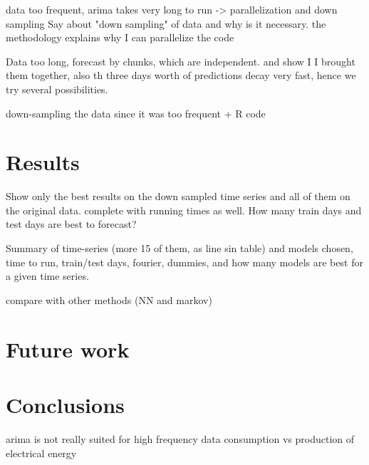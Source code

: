 \documentclass[12pt,a4paper,titlepage]{report}
\begin{document}
data too frequent, arima takes very long to run -> parallelization and down sampling
Say about "down sampling" of data and why is it necessary.
the methodology explains why I can parallelize the code

Data too long, forecast by chunks, which are independent. and show I I brought them together, also th three days worth of predictions decay very fast, hence we try several possibilities.

down-sampling the data since it was too frequent + R code

\section{Results} \label{resultssection}

Show only the best results on the down sampled time series and all of them on the original data. complete with running times as well.
How many train days and test days are best to forecast?

Summary of time-series (more 15 of them, as line sin table) and models chosen, time to run, train/test days, fourier, dummies, and how many models are best for a given time series.


compare with other methods (NN and markov)


\section{Future work}

\section{Conclusions}

arima is not really suited for high frequency data
consumption vs production of electrical energy
\newpage


\end{document}

